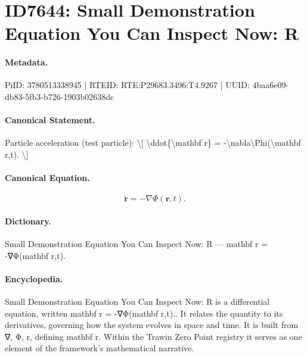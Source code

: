 \section*{ID7644: Small Demonstration Equation You Can Inspect Now: R}
\paragraph{Metadata.}
PiID: 3780513338945 | RTEID: RTE:P29683.3496:T4.9267 | UUID: 4baa6e09-db83-5fb3-b726-1903b02638dc

\paragraph{Canonical Statement.}
Particle acceleration (test particle): \textbackslash{}[ \textbackslash{}ddot\{\textbackslash{}mathbf r\} = -\textbackslash{}nabla\textbackslash{}Phi(\textbackslash{}mathbf r,t). \textbackslash{}]

\paragraph{Canonical Equation.}
\[
\ddot{\mathbf r} = -\nabla\Phi(\mathbf r,t).
\]

\paragraph{Dictionary.}
Small Demonstration Equation You Can Inspect Now: R — mathbf r = -∇Φ(mathbf r,t).

\paragraph{Encyclopedia.}
Small Demonstration Equation You Can Inspect Now: R is a differential equation, written mathbf r = -∇Φ(mathbf r,t).. It relates the quantity to its derivatives, governing how the system evolves in space and time. It is built from ∇, Φ, r, defining mathbf r. Within the Trawin Zero Point registry it serves as one element of the framework's mathematical narrative.
